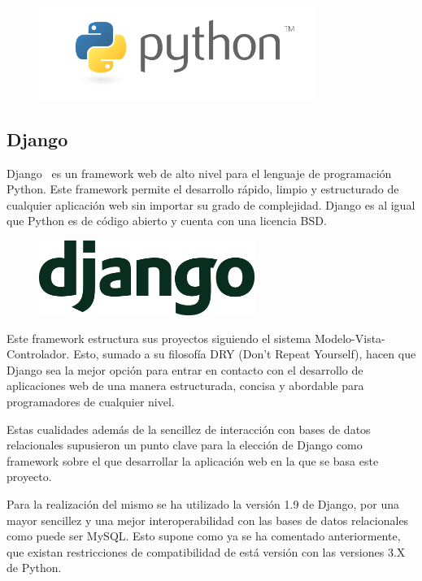 \documentclass[a4paper, spanish, 12pt]{book}
\begin{document}
\begin{figure}[H]
  \centering
  \includegraphics[width=9cm, keepaspectratio]{img/python-logo}
\end{figure}

\subsection{Django}
\label{subsec:django}

Django~\cite{django} es un framework web de alto nivel para el lenguaje de
programaci\'on Python. Este framework permite el desarrollo r\'apido, limpio y
estructurado de cualquier aplicaci\'on web sin importar su grado de complejidad.
Django es al igual que Python es de c\'odigo abierto y cuenta con una licencia BSD.

\begin{figure}[H]
  \centering
  \includegraphics[width=7cm, keepaspectratio]{img/django-logo}
\end{figure}

Este framework estructura sus proyectos siguiendo el sistema Modelo-Vista-Controlador.
Esto, sumado a su filosof\'ia DRY (Don't Repeat Yourself), hacen que Django sea
la mejor opci\'on para entrar en contacto con el desarrollo de aplicaciones web
de una manera estructurada, concisa y abordable para programadores de cualquier
nivel.

Estas cualidades adem\'as de la sencillez de interacci\'on con bases de datos
relacionales supusieron un punto clave para la elecci\'on de Django como
framework sobre el que desarrollar la aplicaci\'on web en la que se basa este proyecto.

Para la realizaci\'on del mismo se ha utilizado la versi\'on 1.9 de Django, por una
mayor sencillez y una mejor interoperabilidad con las bases de datos relacionales
como puede ser MySQL. Esto supone como ya se ha comentado anteriormente, que existan
restricciones de compatibilidad de est\'a versi\'on con las versiones 3.X de Python.
\end{document}
